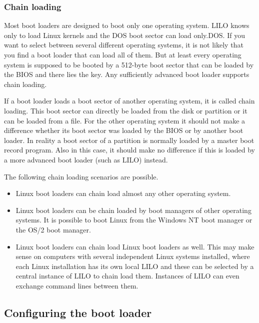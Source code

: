 \documentclass[12pt,a4paper]{article}
\begin{document}
\subsubsection{Chain loading}

Most boot loaders are designed to boot only one operating system. LILO
knows only to load Linux kernels and the DOS boot sector can load
only.DOS. If you want to select between several different operating
systems, it is not likely that you find a boot loader that can load
all of them. But at least every operating system is
supposed to be booted by a 512-byte boot sector that can be loaded by
the BIOS and there lies the key. Any sufficiently advanced boot loader
supports chain loading. 

If a boot loader loads a boot sector of another operating system, it
is called chain loading. This boot sector can directly be loaded from
the disk or partition or it can be loaded from a file. For the other
operating system it should not make a difference whether its boot
sector was loaded by the BIOS or by another boot loader. In reality a
boot sector of a partition is normally loaded by a master boot record
program. Also in this case, it should make no difference if this is
loaded by a more advanced boot loader (such as LILO) instead.

The following chain loading scenarios are possible.
\begin{itemize}
\item Linux boot loaders can chain load almost any other operating system.
\item Linux boot loaders can be chain loaded by boot managers of other
  operating systems. It is possible to boot Linux from the Windows NT
  boot manager or the OS/2 boot manager.
\item Linux boot loaders can chain load Linux boot loaders as
  well. This may make sense on computers with several independent
  Linux systems installed, where each Linux installation has its own
  local LILO and these can be selected by a central instance of LILO
  to chain load them. Instances of LILO can even exchange command
  lines between them.
\end{itemize}


\subsection{Configuring the boot loader}
\end{document}
